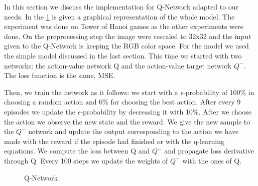 In this section we discuss the implementation for Q-Network adapted to our needs. In the \ref{fig:qmodel} is given a graphical representation of the whole model. The experiment was done on Tower of Hanoi games as the other experiments were done. On the preprocessing step the image were rescaled to 32x32 and the input given to the Q-Network is keeping the RGB color space. For the model we used the simple model discussed in the last section. This time we started with two networks: the action-value network Q and the action-value target network $Q^-$. The loss function is the same, MSE.

Then, we train the network as it follows: we start with a $\epsilon$-probability of 100\% in choosing a random action and 0\% for choosing the best action. After every 9 episodes we update the $\epsilon$-probability by decreasing it with 10\%. After we choose the action we observe the new state and the reward. We give the new sample to the $Q^-$ network and update the output corresponding to the action we have made with the reward if the episode had finished or with the q-learning equations. We compute the loss between Q and $Q^-$ and propagate loss derivative through Q. Every 100 steps we update the weights of $Q^-$ with the ones of Q.


\begin{figure}[h]
	\begin{center}
		\caption{Q-Network} \label{fig:qmodel}
    \end{center}
\end{figure}

